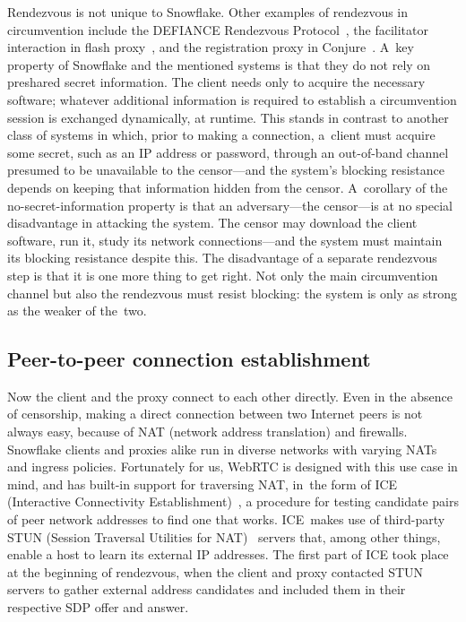 \documentclass[letterpaper,twocolumn]{article}
\begin{document}
Rendezvous is not unique to Snowflake.
Other examples of rendezvous in circumvention include
the DEFIANCE Rendezvous Protocol~\cite[\S 3]{Lincoln2012a},
the facilitator interaction in flash proxy~\cite[\S 3]{Fifield2012a},
and the registration proxy in Conjure~\cite[\S 4.1]{Frolov2019b}.
A~key property of Snowflake and the mentioned systems
is that they do not rely on preshared secret information.
The client needs only to acquire the necessary software;
whatever additional information is required to establish a circumvention session
is exchanged dynamically, at runtime.
This stands in contrast to another class of systems in which,
prior to making a connection,
a~client must acquire some secret,
such as an IP address or password,
through an out-of-band channel
presumed to be unavailable to the censor---and
the system's blocking resistance depends on
keeping that information hidden from the censor.
A~corollary of the no-secret-information property
is that an adversary---the censor---is
at no special disadvantage in attacking the system.
The censor may download the client software,
run it, study its network connections---and
the system must maintain its blocking resistance despite this.
The disadvantage of a separate rendezvous step
is that it is one more thing to get right.
Not only the main circumvention channel
but also the rendezvous must resist blocking:
the system is only as strong as the weaker of the~two.

\subsection{Peer-to-peer connection establishment}
\label{sec:connection}

Now the client and the proxy connect to each other directly.
Even in the absence of censorship,
making a direct connection between two Internet peers is not always easy,
because of NAT (network address translation) and firewalls.
Snowflake clients and proxies alike run in diverse networks
with varying NATs and ingress policies.
Fortunately for us,
WebRTC is designed with this use case in mind,
and has built-in support for traversing NAT, in~the form of
ICE (Interactive Connectivity Establishment)~\cite{rfc8445},
a procedure for testing candidate pairs of peer network addresses
to find one that works.
ICE~makes use of third-party
STUN (Session Traversal Utilities for NAT)~\cite{rfc8489}
servers that, among other things,
enable a host to learn its external IP addresses.
The first part of ICE took place at the beginning of rendezvous,
when the client and proxy contacted STUN servers to gather
external address candidates and included them in their respective
SDP offer and answer.
\end{document}
